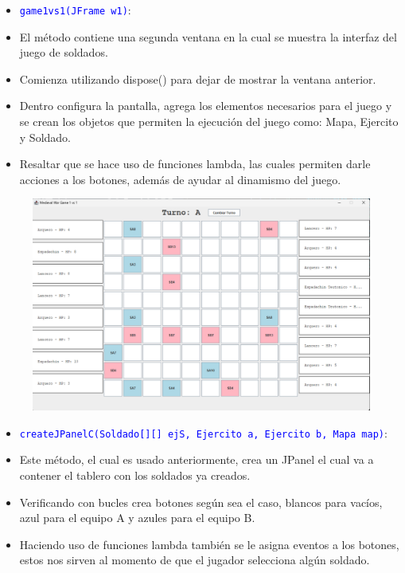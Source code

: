 \documentclass{article}
\begin{document}

\begin{itemize}
    \item \texttt{\textcolor{blue}{game1vs1(JFrame w1)}}: 
    \item El método contiene una segunda ventana en la cual se muestra la interfaz del juego de soldados.
    \item Comienza utilizando dispose() para dejar de mostrar la ventana anterior.
    \item Dentro configura la pantalla, agrega los elementos necesarios para el juego y se crean los objetos que permiten la ejecución del juego como: Mapa, Ejercito y Soldado.
    \item Resaltar que se hace uso de funciones lambda, las cuales permiten darle acciones a los botones, además de ayudar al dinamismo del juego.
\end{itemize}
\begin{figure}[H]
    \centering
    \includegraphics[width=1\textwidth,keepaspectratio]{img/vj2.png}
    \caption{}
\end{figure}

\newpage
\begin{itemize}
    \item \texttt{\textcolor{blue}{createJPanelC(Soldado[][] ejS, Ejercito a, Ejercito b, Mapa map)}}: 
    \item Este método, el cual es usado anteriormente, crea un JPanel el cual va a contener el tablero con los soldados ya creados.
    \item Verificando con bucles crea botones según sea el caso, blancos para vacíos, azul para el equipo A y azules para el equipo B.
    \item Haciendo uso de funciones lambda también se le asigna eventos a los botones, estos nos sirven al momento de que el jugador selecciona algún soldado.
\end{itemize}
\end{document}
